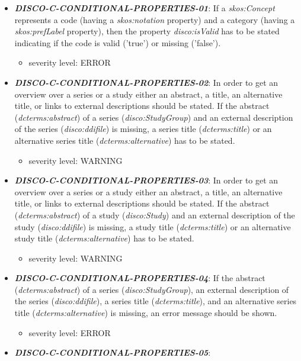\documentclass{llncs}
\begin{document}
\begin{itemize}
	\item \textbf{{\em DISCO-C-CONDITIONAL-PROPERTIES-01}}:
  If a {\em skos:Concept} represents a code (having a {\em skos:notation} property) and a category (having a {\em skos:prefLabel} property), 
then the property {\em disco:isValid} has to be stated indicating if the code is valid ('true') or missing ('false').
	\begin{itemize}
		\item severity level: ERROR
	\end{itemize}
	\item \textbf{{\em DISCO-C-CONDITIONAL-PROPERTIES-02}}:
	In order to get an overview over a series or a study either an abstract, a title, an alternative title, or links to external descriptions should be stated. 
	If the abstract (\emph{dcterms:abstract}) of a series (\emph{disco:StudyGroup}) and an external description of the series (\emph{disco:ddifile}) is missing, 
	a series title (\emph{dcterms:title}) or an alternative series title (\emph{dcterms:alternative}) has to be stated.
	\begin{itemize}
		\item severity level: WARNING
	\end{itemize}
	\item \textbf{{\em DISCO-C-CONDITIONAL-PROPERTIES-03}}:
	In order to get an overview over a series or a study either an abstract, a title, an alternative title, or links to external descriptions should be stated. 
	If the abstract (\emph{dcterms:abstract}) of a study (\emph{disco:Study}) and an external description of the study (\emph{disco:ddifile}) is missing, 
	a study title (\emph{dcterms:title}) or an alternative study title (\emph{dcterms:alternative}) has to be stated.
	\begin{itemize}
		\item severity level: WARNING
	\end{itemize}
	\item \textbf{{\em DISCO-C-CONDITIONAL-PROPERTIES-04}}:
	If the abstract (\emph{dcterms:abstract}) of a series (\emph{disco:StudyGroup}), an external description of the series (\emph{disco:ddifile}), 
	a series title (\emph{dcterms:title}), and an alternative series title (\emph{dcterms:alternative}) is missing, an error message should be shown.
	\begin{itemize}
		\item severity level: ERROR
	\end{itemize}
	\item \textbf{{\em DISCO-C-CONDITIONAL-PROPERTIES-05}}:

\end{itemize}
\end{document}
